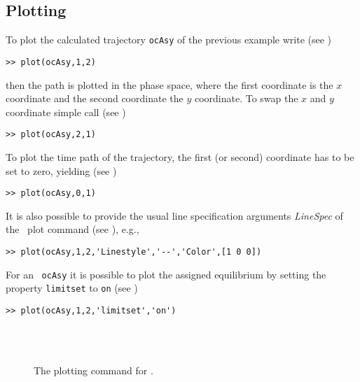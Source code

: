 \subsection{Plotting \octrajectory}
To plot the calculated trajectory \lstinline+ocAsy+ of the previous example write (see )
\begin{lstlisting}
>> plot(ocAsy,1,2)
\end{lstlisting}
then the path is plotted in the phase space, where the first coordinate is the $x$ coordinate and the second coordinate the $y$ coordinate. To swap the $x$ and $y$ coordinate simple call (see )
\begin{lstlisting}
>> plot(ocAsy,2,1)
\end{lstlisting}
To plot the time path of the trajectory, the first (or second) coordinate has to be set to zero, yielding (see )
\begin{lstlisting}
>> plot(ocAsy,0,1)
\end{lstlisting}
It is also possible to provide the usual line specification arguments \emph{LineSpec} of the \MATL\ plot command (see ), e.g.,
\begin{lstlisting}
>> plot(ocAsy,1,2,'Linestyle','--','Color',[1 0 0])
\end{lstlisting}
For  an \ocasymptotic\ \lstinline+ocAsy+ it is possible to plot the assigned equilibrium by setting the property \lstinline+limitset+ to \lstinline+on+ (see )
\begin{lstlisting}
>> plot(ocAsy,1,2,'limitset','on')
\end{lstlisting}
\begin{figure}
\centering
	\goodgap
	\\
	\goodgap
	\\
	\goodgap
	\label{fig:plot01}
	\caption{The plotting command for \octrajectory.}
\end{figure}
